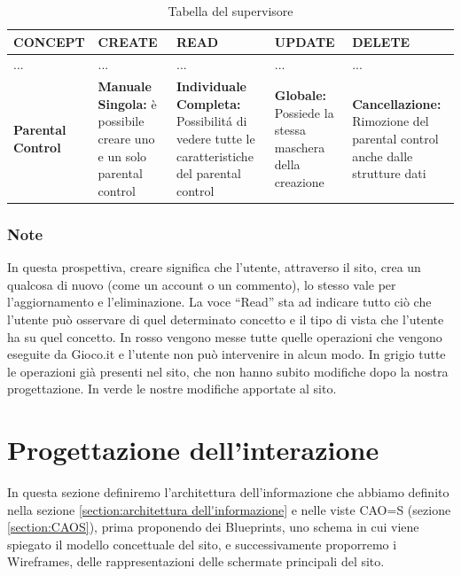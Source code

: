 \documentclass[../Report.tex]{subfiles}
\begin{document}
    \begin{table}[H]
        \hspace{-2.5cm}
        \begin{tabular}{|p{2.5cm}|p{3.5cm}|p{3.5cm}|p{3.5cm}|p{3.5cm}|}
            \hline
            \textbf{CONCEPT} & \textbf{CREATE} & \textbf{READ} & \textbf{UPDATE} & \textbf{DELETE} \\
            \hline
            ... & ... & ... & ... & ... \\
            \hline
            \textbf{Parental Control} & \cellcolor{green} \textbf{Manuale Singola:} è possibile creare uno e un solo parental control & \cellcolor{green} \textbf{Individuale Completa:} Possibilitá di vedere tutte le caratteristiche del parental control & \cellcolor{green} \textbf{Globale:} Possiede la stessa maschera della creazione & \cellcolor{green} \textbf{Cancellazione:} Rimozione del parental control anche dalle strutture dati \\
            \hline
        \end{tabular}
        \caption{\label{tab:supervisore}Tabella del supervisore}
    \end{table}
    
    \subsubsection{Note}
    In questa prospettiva, creare significa che l’utente, attraverso il sito, crea un qualcosa di nuovo (come un account o un commento), lo stesso vale per l’aggiornamento e l’eliminazione. La voce “Read” sta ad indicare tutto ciò che l’utente può osservare di quel determinato concetto e il tipo di vista che l'utente ha su quel concetto. In rosso vengono messe tutte quelle operazioni che vengono eseguite da Gioco.it e l’utente non può intervenire in alcun modo. In grigio tutte le operazioni già presenti nel sito, che non hanno subito modifiche dopo la nostra progettazione. In verde le nostre modifiche apportate al sito.

    \section{Progettazione dell'interazione}
    In questa sezione definiremo l'architettura dell'informazione che abbiamo definito nella sezione \ref{section:architettura dell'informazione} e nelle viste CAO=S (sezione \ref{section:CAOS}), prima proponendo dei Blueprints, uno schema in cui viene spiegato il modello concettuale del sito, e successivamente proporremo i Wireframes, delle rappresentazioni delle schermate principali del sito.
\end{document}

